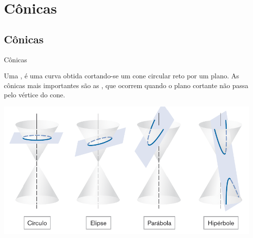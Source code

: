 \section{Cônicas}




\subsection*{Cônicas}
\begin{frame}[label=conicas]{Cônicas}

 Uma , é uma curva obtida cortando-se um
cone circular reto por um plano. As cônicas mais importantes são
as , que ocorrem quando o plano 
cortante não passa pelo vértice do cone.

\begin{center}
\includegraphics[scale=.4]{figuras/conicas.png}
\end{center}
%
\end{frame}


